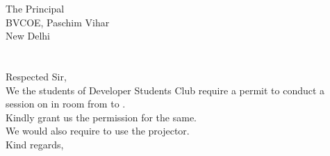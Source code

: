 \documentclass[12pt,a4paper]{article} %
\begin{document}
	

	\hspace{-8mm}
	The Principal \\
	BVCOE, Paschim Vihar\\
	New Delhi\\
	\linebreak
	\\
	\linebreak
	\textbf{}\\
	\linebreak
	Respected Sir,\\
	
	\vspace{-5mm}
	\hspace{8mm}
	We the students of Developer Students Club require a permit to conduct a session on 
	in room
	from 
	to 
	.\\
	Kindly grant us the permission for the same. \\
	We would also require to use the projector.\\
	\linebreak
	Kind regards,\\
	\\
	
\end{document}
